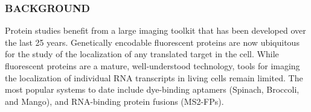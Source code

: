 \subsubsection*{BACKGROUND}
Protein studies benefit from a large imaging toolkit that has been developed over the last 25 years. Genetically encodable fluorescent proteins are now ubiquitous for the study of the localization of any translated target in the cell. While fluorescent proteins are a mature, well-understood technology, tools for imaging the localization of individual RNA transcripts in living cells remain limited. The most popular systems to date include dye-binding aptamers (Spinach\cite{PaigeRNAMimicsGreen2011}, Broccoli\cite{FilonovBroccoliRapidSelection2014}, and Mango\cite{AutourFluorogenicRNAMango2018,DolgosheinaRNAMangoAptamerFluorophore2014}), and RNA-binding protein fusions (MS2-FPs)\cite{FuscoSinglemRNAMolecules2003}.
